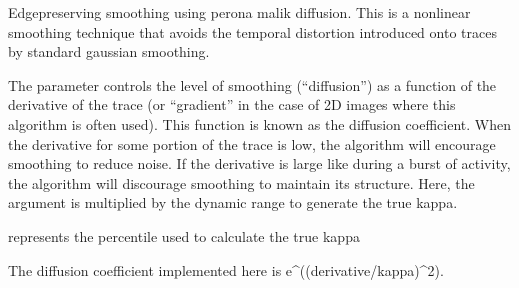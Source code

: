 \documentclass[letterpaper,10pt,english]{sphinxmanual}
\begin{document}
\begin{fulllineitems}
\label{\detokenize{CalSciPy.trace_processing:CalSciPy.trace_processing.perona_malik_diffusion}}
\pysigstartsignatures
{}
\pysigstopsignatures
\sphinxAtStartPar
Edge\sphinxhyphen{}preserving smoothing using perona malik diffusion. This is a non\sphinxhyphen{}linear smoothing technique that avoids the
temporal distortion introduced onto traces by standard gaussian smoothing.

\sphinxAtStartPar
The parameter  controls the level of smoothing (“diffusion”) as a function of the derivative of the trace
(or “gradient” in the case of 2D images where this algorithm is often used). This function is known as the
diffusion coefficient. When the derivative for some portion of the trace is low, the algorithm will encourage
smoothing to reduce noise. If the derivative is large like during a burst of activity, the algorithm will discourage
smoothing to maintain its structure. Here, the argument  is multiplied by the dynamic range to generate the
true kappa.

\sphinxAtStartPar
represents the percentile used to calculate the true
kappa

\sphinxAtStartPar
The diffusion coefficient implemented here is e\textasciicircum{}(\sphinxhyphen{}(derivative/kappa)\textasciicircum{}2).


\end{fulllineitems}
\end{document}
